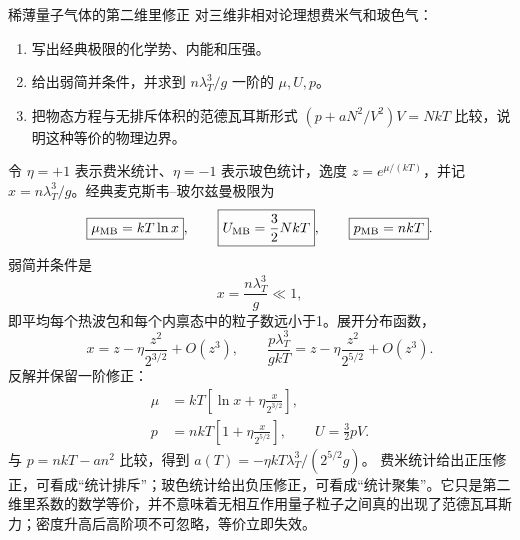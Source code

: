 \begin{advexamplebox}{稀薄量子气体的第二维里修正}\label{advA2:ex:quantum-virial}
对三维非相对论理想费米气和玻色气：
\begin{enumerate}
 \item 写出经典极限的化学势、内能和压强。
 \item 给出弱简并条件，并求到 $n\lambda_T^3/g$ 一阶的 $\mu,U,p$。
 \item 把物态方程与无排斥体积的范德瓦耳斯形式
 $(p+aN^2/V^2)V=NkT$ 比较，说明这种等价的物理边界。
\end{enumerate}

\AQQuantumVirial
\end{advexamplebox}
\begin{advsolution}
\AAQuantumVirial

令 $\eta=+1$ 表示费米统计、$\eta=-1$ 表示玻色统计，逸度
$z=e^{\mu/(kT)}$，并记 $x=n\lambda_T^3/g$。经典麦克斯韦--玻尔兹曼极限为
\[
 \boxed{\mu_{\rm MB}=kT\ln x},\qquad
 \boxed{U_{\rm MB}=\frac32NkT},\qquad
 \boxed{p_{\rm MB}=nkT}.
\]
弱简并条件是
\[
 \boxed{x=\frac{n\lambda_T^3}{g}\ll1},
\]
即平均每个热波包和每个内禀态中的粒子数远小于1。展开分布函数，
\[
 x=z-\eta\frac{z^2}{2^{3/2}}+O(z^3),
 \qquad
 \frac{p\lambda_T^3}{gkT}
 =z-\eta\frac{z^2}{2^{5/2}}+O(z^3).
\]
反解并保留一阶修正：
\[
 \begin{aligned}
 \mu&=kT\left[\ln x+\eta\frac{x}{2^{3/2}}\right],\\
 p&=nkT\left[1+\eta\frac{x}{2^{5/2}}\right],\qquad U=\frac32pV.
 \end{aligned}
\]
与 $p=nkT-an^2$ 比较，得到 $a(T)=-\eta kT\lambda_T^3/(2^{5/2}g)$。
费米统计给出正压修正，可看成“统计排斥”；玻色统计给出负压修正，可看成“统计聚集”。它只是第二维里系数的数学等价，并不意味着无相互作用量子粒子之间真的出现了范德瓦耳斯力；密度升高后高阶项不可忽略，等价立即失效。
\end{advsolution}
